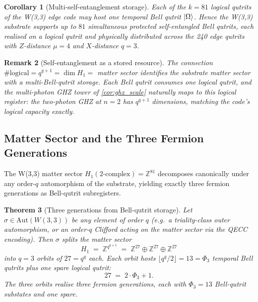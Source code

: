 ﻿\documentclass[12pt]{article}
\newtheorem{theorem}{Theorem}[section]
\newtheorem{corollary}[theorem]{Corollary}
\newtheorem{remark}[theorem]{Remark}
\newcommand{\ZZ}{\mathbb{Z}}
\begin{document}
\begin{corollary}[Multi-self-entanglement storage]\label{cor:multi_bell}
Each of the $k = 81$ logical qutrits of the W(3,3) edge code may host one
temporal Bell qutrit $\ket{\Omega}$.  Hence the W(3,3) substrate supports
\emph{up to $81$ simultaneous protected self-entangled Bell qutrits}, each
realised on a logical qutrit and physically distributed across the 240
edge qutrits with $Z$-distance $\mu = 4$ and $X$-distance $q = 3$.
\end{corollary}

\begin{remark}[Self-entanglement as a stored resource]
The connection $\#\text{logical} = q^{q+1} = \dim H_1 = $ matter sector
identifies the substrate matter sector with a \emph{multi-Bell-qutrit
storage}.  Each Bell qutrit consumes one logical qutrit, and the
multi-photon GHZ tower of \cref{cor:ghz_scale} naturally maps to this
logical register: the two-photon GHZ at $n = 2$ has $q^{q+1}$ dimensions,
matching the code's logical capacity exactly.
\end{remark}

\subsection{Matter Sector and the Three Fermion Generations}
\label{sec:generations}

The W(3,3) matter sector $H_1(2\text{-complex}) = \ZZ^{81}$ decomposes
canonically under any order-$q$ automorphism of the substrate, yielding
exactly three fermion generations as Bell-qutrit subregisters.

\begin{theorem}[Three generations from Bell-qutrit storage]\label{thm:three_gens}
Let $\sigma \in \mathrm{Aut}(W(3,3))$ be any element of order $q$ (e.g.\
a triality-class outer automorphism, or an order-$q$ Clifford acting on the
matter sector via the QECC encoding).  Then $\sigma$ splits the matter
sector
\begin{equation}
  H_1  \;=\;  \ZZ^{q^{q+1}}
        \;=\;  \ZZ^{27} \oplus \ZZ^{27} \oplus \ZZ^{27}
\end{equation}
into $q = 3$ orbits of $27 = q^q$ each.  Each orbit hosts
$\lfloor q^q/2 \rfloor = 13 = \Phi_3$ temporal Bell qutrits plus one spare
logical qutrit:
\begin{equation}
  27 \;=\; 2 \cdot \Phi_3 + 1.
\end{equation}
The three orbits realise three fermion generations, each with $\Phi_3 = 13$
Bell-qutrit substates and one spare.
\end{theorem}
\end{document}
